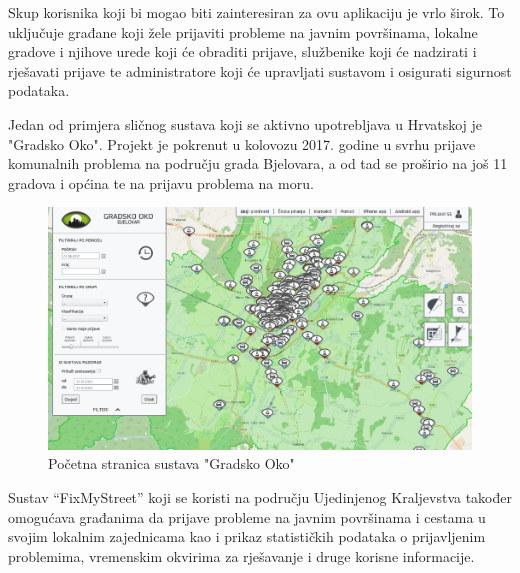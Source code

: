 \noindent Skup korisnika koji bi mogao biti zainteresiran za ovu aplikaciju je vrlo širok. To uključuje građane koji žele prijaviti probleme na javnim površinama, lokalne gradove i njihove urede koji će obraditi prijave, službenike koji će nadzirati i rješavati prijave te administratore koji će upravljati sustavom i osigurati sigurnost podataka.

\noindent Jedan od primjera sličnog sustava koji se aktivno upotrebljava u Hrvatskoj je "Gradsko Oko". Projekt je pokrenut u kolovozu 2017. godine u svrhu prijave komunalnih problema na području grada Bjelovara, a od tad se proširio na još 11 gradova i općina te na prijavu problema na moru.

\begin{figure}[H]
	\includegraphics[scale=0.5]{slike/GradskoOko.png} %
	\centering
	\caption{Početna stranica sustava "Gradsko Oko"}
	\label{fig:GradskoOkoPrimjer}
\end{figure}

\noindent Sustav “FixMyStreet” koji se koristi na području Ujedinjenog Kraljevstva također omogućava građanima da prijave probleme na javnim površinama i cestama u svojim lokalnim zajednicama kao i prikaz statističkih podataka o prijavljenim problemima, vremenskim okvirima za rješavanje i druge korisne informacije.

